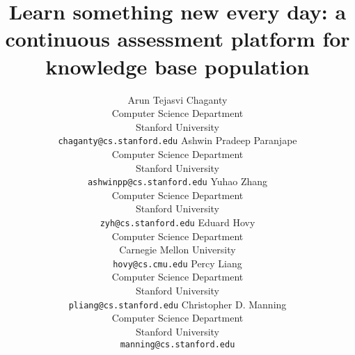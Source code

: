 \documentclass[11pt]{article}
\title{Learn something new every day: a continuous assessment platform for knowledge base population}
\author{%
  Arun Tejasvi Chaganty \\
  Computer Science Department \\
  Stanford University \\
  {\tt chaganty@cs.stanford.edu}
\And%
  Ashwin Pradeep Paranjape \\
  Computer Science Department \\
  Stanford University \\
  {\tt ashwinpp@cs.stanford.edu}
\And%
  Yuhao Zhang \\
  Computer Science Department \\
  Stanford University \\
  {\tt zyh@cs.stanford.edu}
\And%
  Eduard Hovy \\
  Computer Science Department \\
  Carnegie Mellon University \\
  {\tt hovy@cs.cmu.edu}
\And%
  Percy Liang \\
  Computer Science Department \\
  Stanford University \\
  {\tt pliang@cs.stanford.edu}
\And%
  Christopher D. Manning \\
  Computer Science Department \\
  Stanford University \\
  {\tt manning@cs.stanford.edu}
}
\date{}
\begin{document}
\maketitle

\begin{abstract}

\end{abstract}











\end{document}
